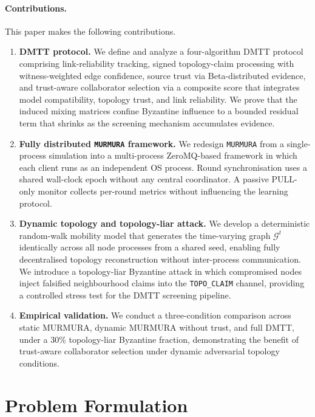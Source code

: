 \documentclass[journal]{IEEEtran}
\newenvironment{added}{\begingroup\color{addedcolor}}{\endgroup}
\theoremstyle{definition}
\theoremstyle{remark}
\begin{document}
\begin{added}
\paragraph{Contributions.}
This paper makes the following contributions.
\begin{enumerate}[leftmargin=2em]
  \item \textbf{DMTT protocol.}
        We define and analyze a four-algorithm DMTT protocol comprising link-reliability tracking, signed topology-claim processing with witness-weighted edge confidence, source trust via Beta-distributed evidence, and trust-aware collaborator selection via a composite score that integrates model compatibility, topology trust, and link reliability. We prove that the induced mixing matrices confine Byzantine influence to a bounded residual term that shrinks as the screening mechanism accumulates evidence.
  \item \textbf{Fully distributed \texttt{MURMURA} framework.}
        We redesign \texttt{MURMURA} from a single-process simulation into a multi-process ZeroMQ-based framework in which each client runs as an independent OS process. Round synchronisation uses a shared wall-clock epoch without any central coordinator. A passive PULL-only monitor collects per-round metrics without influencing the learning protocol.
  \item \textbf{Dynamic topology and topology-liar attack.}
        We develop a deterministic random-walk mobility model that generates the time-varying graph $\mathcal{G}^t$ identically across all node processes from a shared seed, enabling fully decentralised topology reconstruction without inter-process communication. We introduce a topology-liar Byzantine attack in which compromised nodes inject falsified neighbourhood claims into the \texttt{TOPO\_CLAIM} channel, providing a controlled stress test for the DMTT screening pipeline.
  \item \textbf{Empirical validation.}
        We conduct a three-condition comparison across static MURMURA, dynamic MURMURA without trust, and full DMTT, under a 30\% topology-liar Byzantine fraction, demonstrating the benefit of trust-aware collaborator selection under dynamic adversarial topology conditions.
\end{enumerate}
\end{added}

\section{Problem Formulation}
\label{sec:problem}
\end{document}
